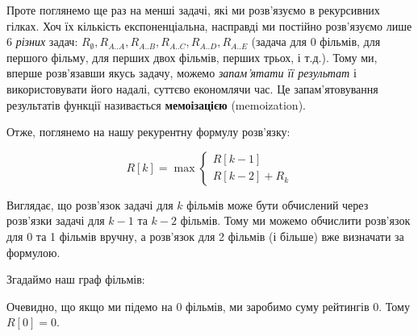 \documentclass[12pt,a4paper]{report}
\begin{document}
Проте поглянемо ще раз на менші задачі, які ми розв’язуємо в рекурсивних гілках. Хоч їх кількість експоненціальна, насправді ми постійно розв’язуємо лише 6 \emph{різних} задач: \(R_{\emptyset}, R_{A..A}, R_{A..B}, R_{A..C}, R_{A..D}, R_{A..E}\) (задача для 0 фільмів, для першого фільму, для перших двох фільмів, перших трьох, і т.д.). Тому ми, вперше розв’язавши якусь задачу, можемо \emph{запам’ятати її результат} і використовувати його надалі, суттєво економлячи час. Це запам’ятовування результатів функції називається \textbf{мемоізацією} (memoization).

Отже, поглянемо на нашу рекурентну формулу розв’язку:

\begin{equation*}
    R[k] = \max
    \begin{cases}
        R[k - 1] \\
        R[k - 2] + R_k
    \end{cases}
\end{equation*}

Виглядає, що розв’язок задачі для \(k\) фільмів може бути обчислений через розв’язки задачі для \(k - 1\) та \(k - 2\) фільмів. Тому ми можемо обчислити розв’язок для 0 та 1 фільмів вручну, а розв’язок для 2 фільмів (і більше) вже визначати за формулою.

Згадаймо наш граф фільмів:

\begin{center}
\end{center}

Очевидно, що якщо ми підемо на 0 фільмів, ми заробимо суму рейтингів 0. Тому \(R[0] = 0\).
\end{document}
